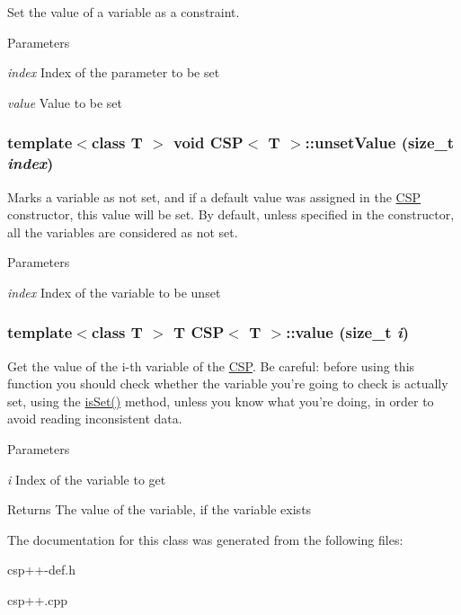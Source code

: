 Set the value of a variable as a constraint. 


\begin{DoxyParams}{Parameters}
\item[{\em index}]Index of the parameter to be set \item[{\em value}]Value to be set \end{DoxyParams}
\hypertarget{classCSP_a4c0cae125a610f519dc22eaec255a0ae}{
\subsubsection[{unsetValue}]{\setlength{\rightskip}{0pt plus 5cm}template$<$class T $>$ void {\bf CSP}$<$ T $>$::unsetValue (size\_\-t {\em index})}}
\label{classCSP_a4c0cae125a610f519dc22eaec255a0ae}


Marks a variable as not set, and if a default value was assigned in the \hyperlink{classCSP}{CSP} constructor, this value will be set. By default, unless specified in the constructor, all the variables are considered as not set. 


\begin{DoxyParams}{Parameters}
\item[{\em index}]Index of the variable to be unset \end{DoxyParams}
\hypertarget{classCSP_aafa5e1a65d6c5d80780437d8d684f32a}{
\subsubsection[{value}]{\setlength{\rightskip}{0pt plus 5cm}template$<$class T $>$ T {\bf CSP}$<$ T $>$::value (size\_\-t {\em i})}}
\label{classCSP_aafa5e1a65d6c5d80780437d8d684f32a}


Get the value of the i-\/th variable of the \hyperlink{classCSP}{CSP}. Be careful: before using this function you should check whether the variable you're going to check is actually set, using the \hyperlink{classCSP_a213dafc1aae7b1825371810a511eca4f}{isSet()} method, unless you know what you're doing, in order to avoid reading inconsistent data. 


\begin{DoxyParams}{Parameters}
\item[{\em i}]Index of the variable to get \end{DoxyParams}
\begin{DoxyReturn}{Returns}
The value of the variable, if the variable exists 
\end{DoxyReturn}


The documentation for this class was generated from the following files:\begin{DoxyCompactItemize}
\item 
csp++-\/def.h\item 
csp++.cpp\end{DoxyCompactItemize}
